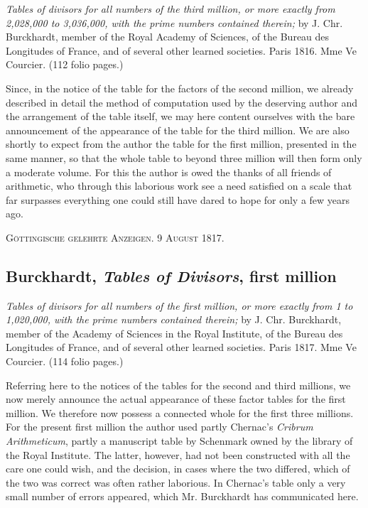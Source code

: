 \documentclass[12pt]{article}
\begin{document}
\begin{center}
\textit{Tables of divisors for all numbers of the third million, or more exactly from 2,028,000 to 3,036,000, with the prime numbers contained therein;} by J. Chr. Burckhardt, member of the Royal Academy of Sciences, of the Bureau des Longitudes of France, and of several other learned societies. Paris 1816. Mme Ve Courcier. (112 folio pages.)
\end{center}

Since, in the notice of the table for the factors of the second million, we already described in detail the method of computation used by the deserving author and the arrangement of the table itself, we may here content ourselves with the bare announcement of the appearance of the table for the third million. We are also shortly to expect from the author the table for the first million, presented in the same manner, so that the whole table to beyond three million will then form only a moderate volume. For this the author is owed the thanks of all friends of arithmetic, who through this laborious work see a need satisfied on a scale that far surpasses everything one could still have dared to hope for only a few years ago.

\begin{center}
\textsc{Göttingische gelehrte Anzeigen. 9 August 1817.}
\end{center}

\subsection*{Burckhardt, \textit{Tables of Divisors}, first million}

\begin{center}
\textit{Tables of divisors for all numbers of the first million, or more exactly from 1 to 1,020,000, with the prime numbers contained therein;} by J. Chr. Burckhardt, member of the Academy of Sciences in the Royal Institute, of the Bureau des Longitudes of France, and of several other learned societies. Paris 1817. Mme Ve Courcier. (114 folio pages.)
\end{center}

Referring here to the notices of the tables for the second and third millions, we now merely announce the actual appearance of these factor tables for the first million. We therefore now possess a connected whole for the first three millions. For the present first million the author used partly Chernac's \textit{Cribrum Arithmeticum}, partly a manuscript table by Schenmark owned by the library of the Royal Institute. The latter, however, had not been constructed with all the care one could wish, and the decision, in cases where the two differed, which of the two was correct was often rather laborious. In Chernac's table only a very small number of errors appeared, which Mr. Burckhardt has communicated here.
\end{document}
